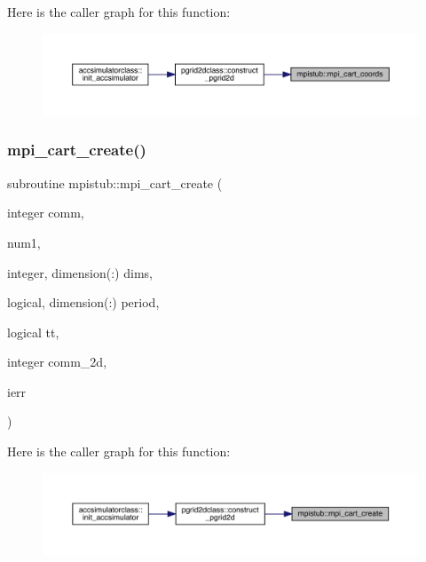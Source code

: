 Here is the caller graph for this function\+:\nopagebreak
\begin{figure}[H]
\begin{center}
\leavevmode
\includegraphics[width=350pt]{namespacempistub_a599bb38fd4a9f405ced50d48c09116ca_icgraph}
\end{center}
\end{figure}
\mbox{\label{namespacempistub_ae0b8402fe840a321a5e4eabbda8ecb43}} 
\subsubsection{\texorpdfstring{mpi\_cart\_create()}{mpi\_cart\_create()}}
{\footnotesize\ttfamily subroutine mpistub\+::mpi\+\_\+cart\+\_\+create (\begin{DoxyParamCaption}\item[{integer}]{comm,  }\item[{}]{num1,  }\item[{integer, dimension(\+:)}]{dims,  }\item[{logical, dimension(\+:)}]{period,  }\item[{logical}]{tt,  }\item[{integer}]{comm\+\_\+2d,  }\item[{}]{ierr }\end{DoxyParamCaption})}

Here is the caller graph for this function\+:\nopagebreak
\begin{figure}[H]
\begin{center}
\leavevmode
\includegraphics[width=350pt]{namespacempistub_ae0b8402fe840a321a5e4eabbda8ecb43_icgraph}
\end{center}
\end{figure}
\mbox{\label{namespacempistub_ab9ac48f74bbcdf05669e63852a220c09}} 

